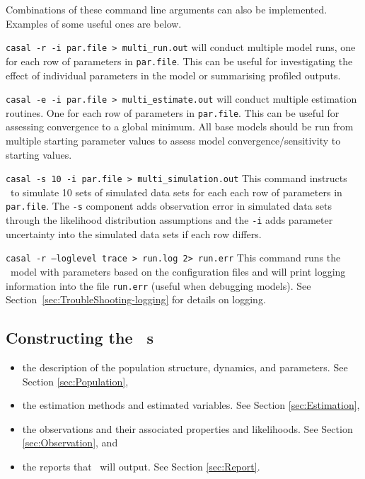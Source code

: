 %
Combinations of these command line arguments can also be implemented. Examples of some useful ones are below.
\begin{description}
	\item \texttt{casal -r -i par.file > multi\_run.out} will conduct multiple model runs, one for each row of parameters in \texttt{par.file}. This can be useful for investigating the effect of individual parameters in the model or summarising profiled outputs.
	
	\item \texttt{casal -e -i par.file > multi\_estimate.out} will conduct multiple estimation routines. One for each row of parameters in \texttt{par.file}. This can be useful for assessing convergence to a global minimum. All base models should be run from multiple starting parameter values to assess model convergence/sensitivity to starting values.
	
	\item \texttt{casal -s 10 -i par.file > multi\_simulation.out} This command instructs \CNAME\ to simulate 10 sets of simulated data sets for each each row of parameters in \texttt{par.file}. The \texttt{-s} component adds observation error in simulated data sets through the likelihood distribution assumptions and the \texttt{-i} adds parameter uncertainty into the simulated data sets if each row differs.
	
	\item \texttt{casal -r --loglevel trace > run.log 2> run.err} This command runs the \CNAME\ model with parameters based on the configuration files and will print logging information into the file \texttt{run.err} (useful when debugging models). See Section~\ref{sec:TroubleShooting-logging} for details on logging.
\end{description}


\subsection{Constructing the \CNAME\ \config s \label{ConstructingConfig}}

\begin{itemize}
	\item the description of the population structure, dynamics, and parameters. See Section \ref{sec:Population},
	\item the estimation methods and estimated variables. See Section \ref{sec:Estimation},
	\item the observations and their associated properties and likelihoods. See Section \ref{sec:Observation}, and
	\item the reports that \CNAME\ will output. See Section \ref{sec:Report}.
\end{itemize}

